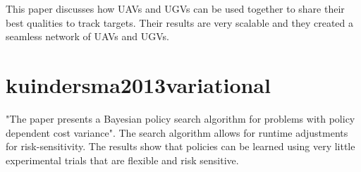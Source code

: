 \documentclass{article}
\begin{document}
This paper discusses how UAVs and UGVs can be used together to share their best
qualities to track targets. Their results are very scalable and they created a
seamless network of UAVs and UGVs.

\section{kuindersma2013variational~\cite{kuindersma2013variational}}

"The paper presents a Bayesian policy search algorithm for problems with policy
dependent cost variance". The search algorithm allows for runtime adjustments
for risk-sensitivity. The results show that policies can be learned using very
little experimental trials that are flexible and risk sensitive.

 
\end{document}
